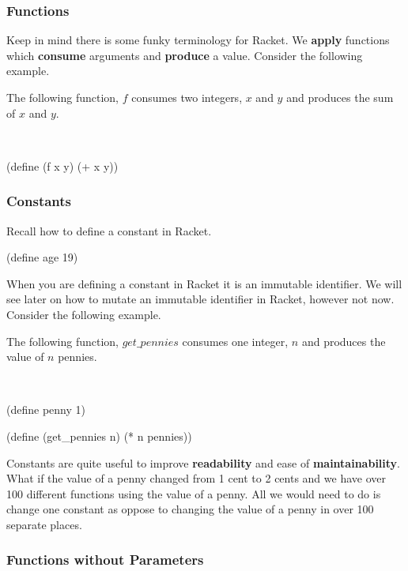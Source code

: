 \documentclass[11pt, twoside, exarticle]{article}
\newcommand{\exbox}[2] {
	\setlength{\fboxsep}{8pt}
	\marginpar {
		\vspace{0.9em}
		\footnotesize{\textbf{\color{darkpurple}EXAMPLE #1}}
	}
	\colorbox{lightpurple}{
		\begin{varwidth}{\dimexpr\linewidth-2\fboxsep}
		#2
		\end{varwidth}
	}
	~\\
}
\begin{document}
\subsubsection*{Functions}

Keep in mind there is some funky terminology for Racket. We \textbf{apply} functions which \textbf{consume} arguments and \textbf{produce} a value. Consider the following example.\\

\exbox{1}{The following function, $f$ consumes two integers, $x$ and $y$ and produces the sum of $x$ and $y$.}

\begin{code}[Lisp]
(define (f x y)
	(+ x y))
\end{code}

\subsubsection*{Constants}

Recall how to define a constant in Racket.\\

\begin{code}[Lisp]
(define age 19)
\end{code}

When you are defining a constant in Racket it is an immutable identifier. We will see later on how to mutate an immutable identifier in Racket, however not now. Consider the following example.\\

\exbox{2}{The following function, $get\_pennies$ consumes one integer, $n$ and produces the value of $n$ pennies.}

\begin{code}[Lisp]
(define penny 1)

(define (get_pennies n)
	(* n pennies))
\end{code}

Constants are quite useful to improve \textbf{readability} and ease of \textbf{maintainability}. What if the value of a penny changed from 1 cent to 2 cents and we have over 100 different functions using the value of a penny. All we would need to do is change one constant as oppose to changing the value of a penny in over 100 separate places.

\subsubsection*{Functions without Parameters}
\end{document}
